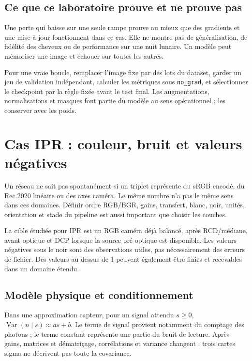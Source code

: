 \documentclass[12pt,a4paper,oneside]{report}
\begin{document}
\section{Ce que ce laboratoire prouve et ne prouve pas}

Une perte qui baisse sur une seule rampe prouve au mieux que des gradients et
une mise à jour fonctionnent dans ce cas. Elle ne montre pas de généralisation,
de fidélité des cheveux ou de performance sur une nuit lunaire. Un modèle
peut mémoriser une image et échouer sur toutes les autres.

Pour une vraie boucle, remplacer l'image fixe par des lots du dataset, garder
un jeu de validation indépendant, calculer les métriques sous
\texttt{no\_grad}, et sélectionner le checkpoint par la règle fixée avant
le test final. Les augmentations, normalisations et masques font partie du
modèle au sens opérationnel : les conserver avec les poids.

\chapter{Cas IPR : couleur, bruit et valeurs négatives}

Un réseau ne sait pas spontanément si un triplet représente du sRGB encodé,
du Rec.2020 linéaire ou des axes caméra. Le même nombre n'a pas le même sens
dans ces domaines. Définir ordre RGB/BGR, gains, transfert, blanc, noir, unités,
orientation et stade du pipeline est aussi important que choisir les couches.

La cible étudiée pour IPR est un RGB caméra déjà balancé, après RCD/médiane,
avant optique et DCP lorsque la source pré-optique est disponible. Les valeurs
négatives sous le noir sont des observations utiles, pas nécessairement des
erreurs de fichier. Des valeurs au-dessus de 1 peuvent également être finies
et recevables dans un domaine étendu.

\section{Modèle physique et conditionnement}

Dans une approximation capteur, pour un signal attendu $s\geq0$,
$\operatorname{Var}(n\mid s)\approx as+b$. Le terme de signal provient
notamment du comptage des photons ; le terme constant représente une partie
du bruit de lecture. Après gains, matrices et dématriçage, corrélations et
variance changent : trois cartes sigma ne décrivent pas toute la covariance.
\end{document}
